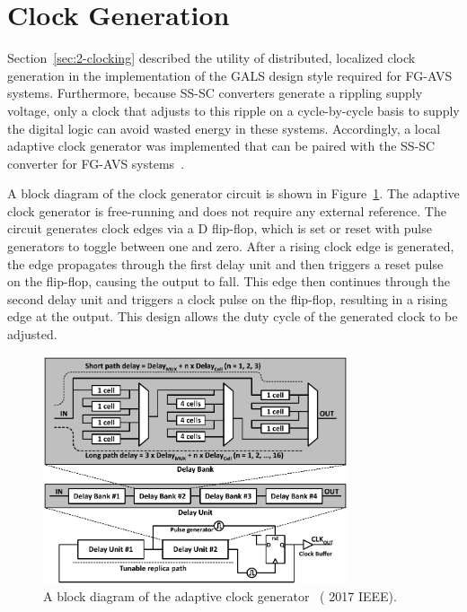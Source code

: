 \documentclass[graybox]{svmult}
\begin{document}
\section{Clock Generation}

Section~\ref{sec:2-clocking} described the utility of distributed, localized clock generation in the implementation of the GALS design style required for FG-AVS systems.
Furthermore, because SS-SC converters generate a rippling supply voltage, only a clock that adjusts to this ripple on a cycle-by-cycle basis to supply the digital logic can avoid wasted energy in these systems.
Accordingly, a local adaptive clock generator was implemented that can be paired with the SS-SC converter for FG-AVS systems~\cite{Keller2017}.

A block diagram of the clock generator circuit is shown in Figure~\ref{fig:3-clockgen}.
The adaptive clock generator is free-running and does not require any external reference.
The circuit generates clock edges via a D flip-flop, which is set or reset with pulse generators to toggle between one and zero.
After a rising clock edge is generated, the edge propagates through the first delay unit and then triggers a reset pulse on the flip-flop, causing the output to fall.
This edge then continues through the second delay unit and triggers a clock pulse on the flip-flop, resulting in a rising edge at the output.
This design allows the duty cycle of the generated clock to be adjusted.

\begin{figure}
  \centering
  \includegraphics[width=0.8\textwidth]{3-clockgen}
  \caption{A block diagram of the adaptive clock generator~\cite{Keller2017} ({\textcopyright} 2017 IEEE).}
  \label{fig:3-clockgen}
\end{figure}
\end{document}
